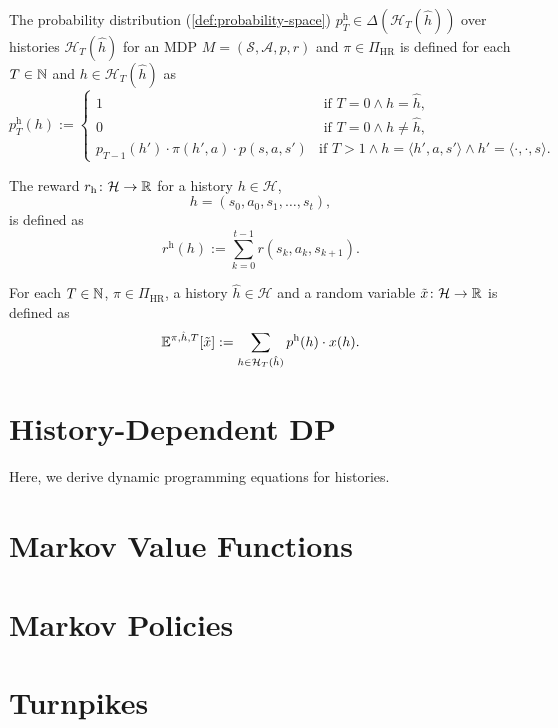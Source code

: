 \begin{definition}
  The probability distribution (\cref{def:probability-space}) $p^{\mathrm{h}}_T \in \Delta(\mathcal{H}_T(\hat{h}))$ over histories $\mathcal{H}_T(\hat{h})$ for an MDP $M = (\mathcal{S}, \mathcal{A}, p, r)$ and $\pi \in \Pi_{\mathrm{HR}}$ is defined for each $T \in \mathbb{N}$ and $h\in \mathcal{H}_T(\hat{h})$ as
  \[
    p^{\mathrm{h}}_T(h) :=
    \begin{cases}
      1 & \text{ if } T = 0 \wedge h = \hat{h}, \\
      0 & \text{ if } T = 0 \wedge h \neq  \hat{h}, \\
      p_{T-1}(h') \cdot \pi(h',a) \cdot  p(s, a , s') &\text{if } T > 1 \wedge h = \langle h', a, s' \rangle \wedge h' = \langle \cdot , \cdot , s \rangle.
    \end{cases}
  \]
  \leanok
\end{definition}

\begin{definition}
  The reward $r_{\mathrm{h}}\colon \mathcal{H} \to \mathbb{R}$ for a history $h \in  \mathcal{H}$,
  \[
   h = (s_0, a_0, s_1, \dots , s_t), 
  \]
  is defined as
  \[
   r^{\mathrm{h}}(h) := \sum_{k=0}^{t-1} r(s_k, a_k, s_{k+1}).
 \]
 \leanok
\end{definition}

\begin{definition}
  For each $T\in \mathbb{N}$, $\pi\in \Pi_{\mathrm{HR}}$, a history $\hat{h}\in \mathcal{H}$ and a random variable $\tilde{x}\colon \mathcal{H} \to \mathbb{R}$ is defined as
  \[
   \mathbb{E}^{\pi, \hat{h}, T} [\tilde{x}]  := \sum_{h\in \mathcal{H}_T(\hat{h})} p^{\mathrm{h}}(h) \cdot x(h).
 \]
 \lean{}
\end{definition}

\section{History-Dependent DP}

Here, we derive dynamic programming equations for histories.

\section{Markov Value Functions}


\section{Markov Policies}

\section{Turnpikes}

